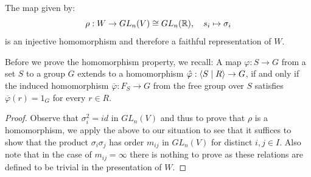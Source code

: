 \begin{theorem}\label{thm:repr}
    The map given by:
    \[\rho : W \to GL_n(V) \cong GL_n(\mathbb{R}), \quad s_i \mapsto \sigma_i\]
    is an injective homomorphism and therefore a faithful representation of \(W\).
\end{theorem}
Before we prove the homomorphism property, we recall:
A map \(\varphi: S\to G\) from a set \(S\) to a group \(G\) extends to a homomorphism \(\Hat{\varphi}:\langle S\;\vert\;R\rangle\to G\), if and only if the induced homomorphism \(\overline{\varphi}:F_S \to G\) from the free group over \(S\) satisfies \(\overline{\varphi}(r) = 1_G\) for every \(r\in R\).
\begin{proof}
    Observe that \(\sigma_i^2 = id\) in \(GL_n(V)\) and thus to prove that \(\rho\) is a homomorphism, we apply the above to our situation to see that it suffices to show that the product \(\sigma_i\sigma_j\) has order \(m_{ij}\) in \(GL_n(V)\) for distinct \(i,j\in I\).
    Also note that in the case of \(m_{ij} = \infty\) there is nothing to prove as these relations are defined to be trivial in the presentation of \(W\).
    

\end{proof}

